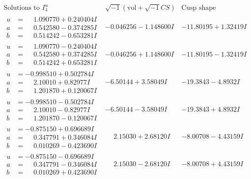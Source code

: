 \documentclass[1p]{elsarticle_modified}
\theoremstyle{definition}
\newcommand{\I}{\sqrt{-1}}
\begin{document}
$$\begin{array}{c|c|c}  
\text{Solutions to }I^u_{4}& \I (\text{vol} + \sqrt{-1}CS) & \text{Cusp shape}\\
 \hline 
\begin{aligned}
u &= \phantom{-}1.090770 + 0.240404 I \\
a &= \phantom{-}0.542580 - 0.374285 I \\
b &= \phantom{-}0.514242 - 0.653281 I\end{aligned}
 & -0.046256 - 1.148600 I & -11.80195 + 1.32419 I \\ \hline\begin{aligned}
u &= \phantom{-}1.090770 - 0.240404 I \\
a &= \phantom{-}0.542580 + 0.374285 I \\
b &= \phantom{-}0.514242 + 0.653281 I\end{aligned}
 & -0.046256 + 1.148600 I & -11.80195 - 1.32419 I \\ \hline\begin{aligned}
u &= -0.998510 + 0.502784 I \\
a &= \phantom{-}2.10010 + 0.82977 I \\
b &= \phantom{-}1.201870 + 0.120067 I\end{aligned}
 & -6.50144 + 3.58049 I & -19.3843 - 4.8932 I \\ \hline\begin{aligned}
u &= -0.998510 - 0.502784 I \\
a &= \phantom{-}2.10010 - 0.82977 I \\
b &= \phantom{-}1.201870 - 0.120067 I\end{aligned}
 & -6.50144 - 3.58049 I & -19.3843 + 4.8932 I \\ \hline\begin{aligned}
u &= -0.875150 + 0.696689 I \\
a &= \phantom{-}0.347791 + 0.346084 I \\
b &= \phantom{-}0.010269 - 0.423690 I\end{aligned}
 & \phantom{-}2.15030 + 2.68120 I & -8.00708 - 4.43159 I \\ \hline\begin{aligned}
u &= -0.875150 - 0.696689 I \\
a &= \phantom{-}0.347791 - 0.346084 I \\
b &= \phantom{-}0.010269 + 0.423690 I\end{aligned}
 & \phantom{-}2.15030 - 2.68120 I & -8.00708 + 4.43159 I \\ \hline\begin{aligned}

\end{aligned}
\end{array}$$
\end{document}
